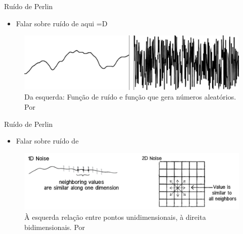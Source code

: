 
\begin{frame}{Ruído de Perlin}
    \begin{itemize}\setlength\itemsep{1em}
        \item Falar sobre ruído de  \cite{perlin2002improving} aqui =D    
    \end{itemize}
    \begin{figure}[H]
        \centering
        \includegraphics[width=.75\textwidth]{img/randomAndNoise}
        \caption{Da esquerda: Função de ruído e função que gera números aleatórios. Por \cite{shiffman2012nature}}
        \label{fig:randomAndNoise}
    \end{figure}
    
\end{frame}

\begin{frame}{Ruído de Perlin}
    \begin{itemize}\setlength\itemsep{1em}
        \item Falar sobre ruído de  
    \end{itemize}
    \begin{figure}[H]
        \centering
        \includegraphics[width=.75\textwidth]{img/1dto2dnoise}
        \caption{À esquerda relação entre pontos unidimensionais, à direita bidimensionais. Por \cite{shiffman2012nature}}
        \label{fig:1dto2dnoise}
    \end{figure}
    
\end{frame}



